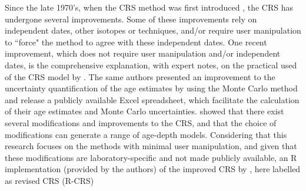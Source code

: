 \documentclass [10pt] {article}
\begin{document}
Since the late 1970's, when the CRS method was first introduced \citep{Appleby1978,Robbins1978}, the CRS has undergone several improvements. 
Some of these improvements rely on independent dates, other isotopes or techniques, and/or require user manipulation to ``force" the method to agree with these independent dates.
One recent improvement, which does not require user manipulation and/or independent dates, is the comprehensive explanation, with expert notes, on the practical used of the CRS model by \citet{Sanchez-Cabeza2012}. 
The same authors presented an improvement to the uncertainty quantification of the age estimates by using the Monte Carlo method \citep{Sanchez-Cabeza2014}
and release a publicly available Excel spreadsheet, which facilitate the calculation of their age estimates and Monte Carlo uncertainties. 
\citet{Barsanti2020} showed that there exist several modifications and improvements to the CRS, and that the choice of modifications can generate a range of age-depth models.
Considering that this research focuses on the methods with minimal user manipulation, and given that these modifications are laboratory-specific and not made publicly available, an R implementation (provided by the authors) of the improved CRS by \citet{Sanchez-Cabeza2014}, here labelled as revised CRS (R-CRS)


\end{document}
